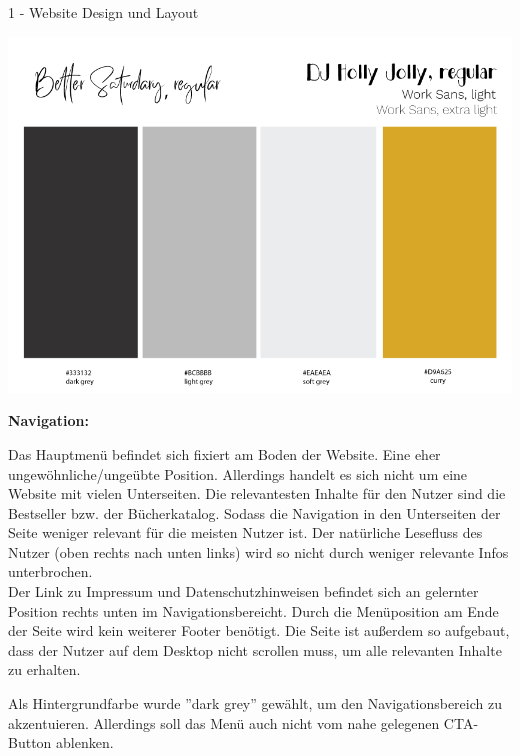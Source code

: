 \documentclass[a4paper]{article}
\begin{document}
\begin{exercise}{1 - Website Design und Layout}
\begin{center}
\includegraphics[scale=0.5]{../colors_fonts.png}
\end{center}

\begin{Large}
\textbf{Navigation:}
\end{Large}
Das Hauptmenü befindet sich fixiert am Boden der Website. Eine eher ungewöhnliche/ungeübte Position. Allerdings handelt es sich nicht um eine Website mit vielen Unterseiten. Die relevantesten Inhalte für den Nutzer sind die Bestseller bzw. der Bücherkatalog. Sodass die Navigation in den Unterseiten der Seite weniger relevant für die meisten Nutzer ist. Der natürliche Lesefluss des Nutzer (oben rechts nach unten links) wird so nicht durch weniger relevante Infos unterbrochen.\\
Der Link zu Impressum und Datenschutzhinweisen befindet sich an gelernter Position rechts unten im Navigationsbereicht.
Durch die Menüposition am Ende der Seite wird kein weiterer Footer benötigt.
Die Seite ist außerdem so aufgebaut, dass der Nutzer auf dem Desktop nicht scrollen muss, um alle relevanten Inhalte zu erhalten.

Als Hintergrundfarbe wurde ''dark grey'' gewählt, um den Navigationsbereich zu akzentuieren. Allerdings soll das Menü auch nicht vom nahe gelegenen CTA-Button ablenken. \\\\


\end{exercise}
\end{document}

